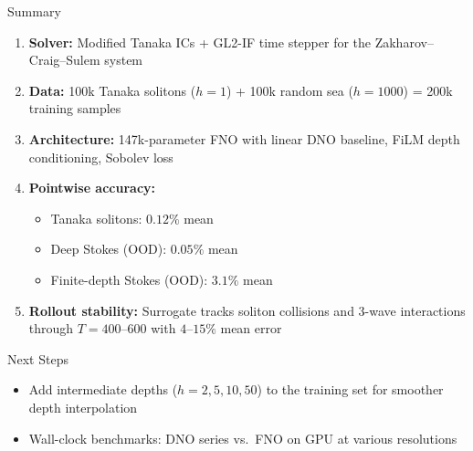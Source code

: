 \documentclass[aspectratio=169,11pt]{beamer}
\DeclareMathOperator{\relltwo}{rel\text{-}L^2}
\begin{document}
\begin{frame}{Summary}

\begin{enumerate}
  \item \textbf{Solver:} Modified Tanaka ICs + GL2-IF time stepper for the Zakharov--Craig--Sulem system
  \item \textbf{Data:} 100k Tanaka solitons ($h = 1$) + 100k random sea ($h = 1000$) = 200k training samples
  \item \textbf{Architecture:} 147k-parameter FNO with linear DNO baseline, FiLM depth conditioning, Sobolev loss
  \item \textbf{Pointwise accuracy:}
    \begin{itemize}
      \item Tanaka solitons: $0.12\%$ mean $\relltwo$
      \item Deep Stokes (OOD): $0.05\%$ mean $\relltwo$
      \item Finite-depth Stokes (OOD): $3.1\%$ mean $\relltwo$
    \end{itemize}
  \item \textbf{Rollout stability:} Surrogate tracks soliton collisions and 3-wave interactions through $T = 400$--$600$ with $4$--$15\%$ mean error
\end{enumerate}
\end{frame}

\begin{frame}{Next Steps}

\begin{itemize}
  \item Add intermediate depths ($h = 2, 5, 10, 50$) to the training set for smoother depth interpolation
  \item Wall-clock benchmarks: DNO series vs.\ FNO on GPU at various resolutions
\end{itemize}
\end{frame}
\end{document}
